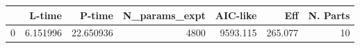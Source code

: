 \begin{tabular}{lrrrrrr}
\toprule
{} &    L-time &     P-time &  N\_params\_expt &  AIC-like &      Eff &  N. Parts \\
\midrule
0 &  6.151996 &  22.650936 &           4800 &  9593.115 &  265.077 &        10 \\
\bottomrule
\end{tabular}
